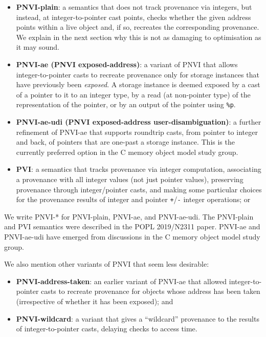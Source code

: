 \documentclass[acmsmall,review,screen]{acmart}\settopmatter{printfolios=true,printccs=false,printacmref=false}
\begin{document}
\begin{itemize}
\item \textbf{PNVI-plain}: a semantics that does not track provenance via integers,
but instead, at integer-to-pointer cast points, checks whether the 
given address points within a live object and, if so, recreates the
corresponding provenance.  We explain in the next section why this is not as damaging to
optimisation as it may sound.

\item \textbf{PNVI-ae (PNVI exposed-address)}: a variant of PNVI that
  allows integer-to-pointer casts to recreate provenance only for
  storage instances that have previously been \emph{exposed}.  A storage instance
  is deemed exposed by a cast 
  of a pointer to it to an integer type, by a read (at non-pointer
  type) of the representation of the pointer, or by an output of the
  pointer using \lstinline{%p}. 

  \item \textbf{PNVI-ae-udi (PNVI exposed-address
    user-disambiguation)}: a further refinement of PNVI-ae that
supports roundtrip casts, from pointer to integer and back, of
pointers that are one-past a storage instance.
This is the currently preferred option in the C memory object model
study group. 

\item \textbf{PVI}: a semantics that tracks provenance via integer computation,
associating a provenance with all integer values (not just pointer
values),
preserving provenance through integer/\break{}pointer casts, and making some
particular choices for the provenance results of integer and
pointer \lstinline{+}/\lstinline{-} integer operations;
or
\end{itemize}
We write PNVI-* for PNVI-plain, PNVI-ae, and PNVI-ae-udi.
The PNVI-plain and PVI semantics were described in the POPL 2019/N2311
paper.  PNVI-ae and PNVI-ae-udi have emerged from discussions in the C
memory object model study group. 


We also mention other variants of PNVI that seem less desirable:
\begin{itemize}
\item \textbf{PNVI-address-taken}: an earlier variant of PNVI-ae that
  allowed integer-to-pointer
  casts  to recreate provenance for objects
whose address has been taken (irrespective of whether it has been exposed);  and
\item \textbf{PNVI-wildcard}: a variant that gives a ``wildcard''
provenance to the results of integer-to-pointer casts, delaying checks
to access time.
\end{itemize}
%
\end{document}
